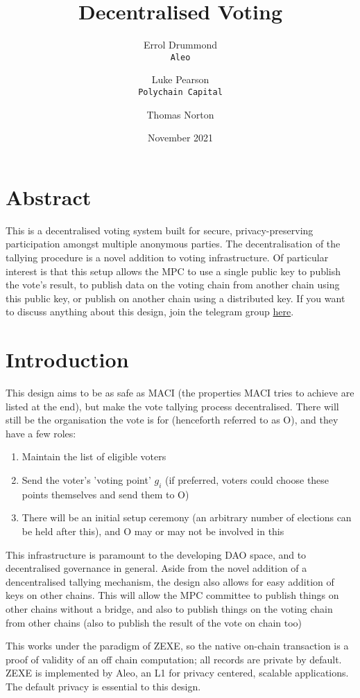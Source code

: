 \documentclass{article}
\title{Decentralised Voting}
\author{Errol Drummond\\ \texttt{Aleo}\\ \and 
 Luke Pearson\\ \texttt{Polychain Capital} \and
 Thomas Norton}
\date{November 2021}
\begin{document}
\maketitle
\section{Abstract}
This is a decentralised voting system built for secure, privacy-preserving participation amongst multiple anonymous parties. The decentralisation of the tallying procedure is a novel addition to voting infrastructure. Of particular interest is that this setup allows the MPC to use a single public key to publish the vote's result, to publish data on the voting chain from another chain using this public key, or publish on another chain using a distributed key. If you want to discuss anything about this design, join the telegram group \href{https://t.me/joinchat/5tZhfUWRwacwNzZk}{here}.

\section{Introduction}
This design aims to be as safe as MACI (the properties MACI tries to achieve are listed at the end), but make the vote tallying process decentralised. There will still be the organisation the vote is for (henceforth referred to as O), and they have a few roles:
\begin{enumerate}
    \item Maintain the list of eligible voters
    \item Send the voter's 'voting point' $g_i$ (if preferred, voters could choose these points themselves and send them to O)
    \item There will be an initial setup ceremony (an arbitrary number of elections can be held after this), and O may or may not be involved in this
\end{enumerate}

This infrastructure is paramount to the developing DAO space, and to decentralised governance in general. Aside from the novel addition of a dencentralised tallying mechanism, the design also allows for easy addition of keys on other chains. This will allow the MPC committee to publish things on other chains without a bridge, and also to publish things on the voting chain from other chains (also to publish the result of the vote on chain too)

This works under the paradigm of ZEXE, so the native on-chain transaction is a proof of validity of an off chain computation; all records are private by default. ZEXE is implemented by Aleo, an L1 for privacy centered, scalable applications. The default privacy is essential to this design.
\end{document}
